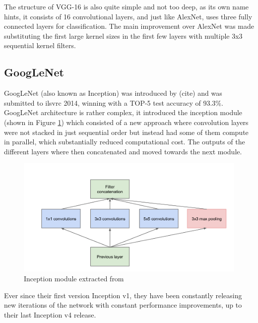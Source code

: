The structure of VGG-16 is also quite simple and not too deep, as its own name hints, it consists of 16 convolutional layers, and just like AlexNet, uses three fully connected layers for classification. The main improvement over AlexNet was made substituting the first large kernel sizes in the first few layers with multiple 3x3 sequential kernel filters.

\subsection{GoogLeNet}
GoogLeNet (also known as Inception) was introduced by (cite) and was submitted to \gls{ilsvrc} 2014, winning with a TOP-5 test accuracy of 93.3\%. GoogLeNet architecture is rather complex, it introduced the inception module (shown in Figure \ref{inception}) which consisted of a new approach where convolution layers were not stacked in just sequential order but instead had some of them compute in parallel, which substantially reduced computational cost. The outputs of the different layers where then concatenated and moved towards the next module.

\begin{figure}
	\includegraphics[scale=0.3]{archivos/inception_module.png}
	\centering
	\caption{Inception module extracted from \cite{DBLP:journals/corr/SzegedyLJSRAEVR14}}
	\label{inception}
\end{figure}

Ever since their first version Inception v1, they have been constantly releasing new iterations of the network with constant performance improvements, up to their last Inception v4 release.

